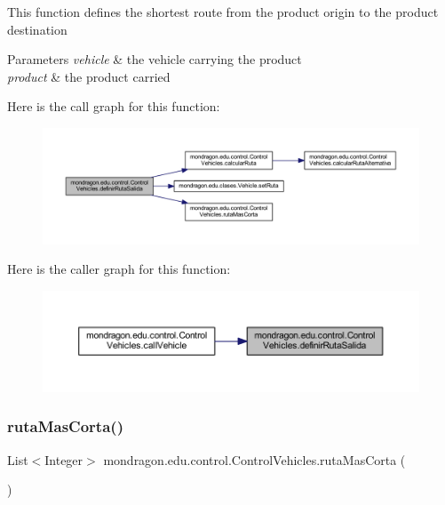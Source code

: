 This function defines the shortest route from the product origin to the product destination


\begin{DoxyParams}{Parameters}
{\em vehicle} & the vehicle carrying the product \\
\hline
{\em product} & the product carried \\
\hline
\end{DoxyParams}
Here is the call graph for this function\+:\nopagebreak
\begin{figure}[H]
\begin{center}
\leavevmode
\includegraphics[width=350pt]{classmondragon_1_1edu_1_1control_1_1_control_vehicles_affe370c8235e69844a66697e87f2bb37_cgraph}
\end{center}
\end{figure}
Here is the caller graph for this function\+:\nopagebreak
\begin{figure}[H]
\begin{center}
\leavevmode
\includegraphics[width=350pt]{classmondragon_1_1edu_1_1control_1_1_control_vehicles_affe370c8235e69844a66697e87f2bb37_icgraph}
\end{center}
\end{figure}
\mbox{\label{classmondragon_1_1edu_1_1control_1_1_control_vehicles_a634e96280352f4014334a21e8bac60b1}} 
\subsubsection{\texorpdfstring{rutaMasCorta()}{rutaMasCorta()}}
{\footnotesize\ttfamily List$<$Integer$>$ mondragon.\+edu.\+control.\+Control\+Vehicles.\+ruta\+Mas\+Corta (\begin{DoxyParamCaption}{ }\end{DoxyParamCaption})\hspace{0.3cm}{\ttfamily [inline]}}

